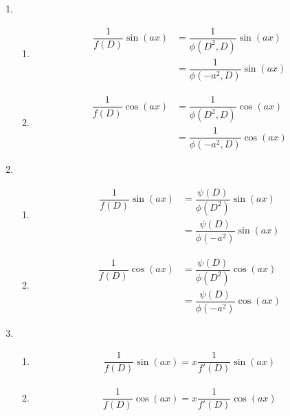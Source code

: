 \documentclass[../main.tex]{subfile}
\begin{document}
\begin{enumerate}
        \item \begin{enumerate}
        \item \begin{align} 
                \dfrac{1}{f(D)} \sin (ax) & = \dfrac{1}{\phi(D^2,D)} \sin (ax) \nonumber \\
                & = \dfrac{1}{\phi(-a^2,D)} \sin (ax) 
              \end{align}

        \item \begin{align}
                 \dfrac{1}{f(D)} \cos (ax) & = \dfrac{1}{\phi(D^2,D)} \cos (ax) \nonumber \\
                 & = \dfrac{1}{\phi(-a^2,D)} \cos (ax) 
              \end{align}
        \end{enumerate}

        \item \begin{enumerate}
        \item \begin{align}
                 \dfrac{1}{f(D)} \sin (ax) & = \dfrac{\psi(D)}{\phi(D^2)} \sin (ax) \nonumber \\
                 & = \dfrac{\psi(D)}{\phi(-a^2)} \sin (ax)
              \end{align}

        \item \begin{align}
                \dfrac{1}{f(D)} \cos (ax) & = \dfrac{\psi(D)}{\phi(D^2)} \cos (ax) \\
                & = \dfrac{\psi(D)}{\phi(-a^2)} \cos (ax)
              \end{align}
        \end{enumerate}

        \item \begin{enumerate}
        \item \begin{align}
                 \dfrac{1}{f(D)} \sin (ax) = x\dfrac{1}{f'(D)} \sin (ax)
              \end{align}

        \item \begin{align}
                 \dfrac{1}{f(D)} \cos (ax) = x\dfrac{1}{f'(D)} \cos (ax)
              \end{align}
        \end{enumerate}
        \end{enumerate}
\end{document}
